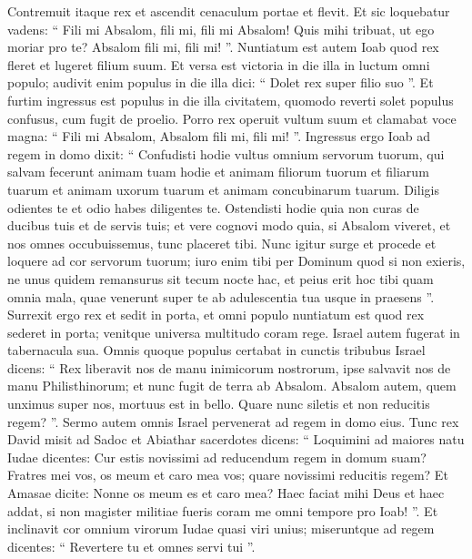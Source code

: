 \begin{biblechapter}
\begin{biblechapter}
\begin{biblechapter}
\begin{biblechapter}
\begin{biblechapter}
\begin{biblechapter}
\begin{biblechapter}
\begin{biblechapter}
\begin{biblechapter}
\begin{biblechapter}
\begin{biblechapter}
\begin{biblechapter}
\begin{biblechapter}
\begin{biblechapter}
\begin{biblechapter}
\begin{biblechapter}
\begin{biblechapter}
\begin{biblechapter}
\begin{biblechapter}
\verse Contremuit itaque rex et ascendit cenaculum portae et flevit. Et sic loquebatur vadens: “ Fili mi Absalom, fili mi, fili mi Absalom! Quis mihi tribuat, ut ego moriar pro te? Absalom fili mi, fili mi! ”.
 \verse Nuntiatum est autem Ioab quod rex fleret et lugeret filium suum. 
\verse Et versa est victoria in die illa in luctum omni populo; audivit enim populus in die illa dici: “ Dolet rex super filio suo ”. 
\verse Et furtim ingressus est populus in die illa civitatem, quomodo reverti solet populus confusus, cum fugit de proelio. 
\verse Porro rex operuit vultum suum et clamabat voce magna: “ Fili mi Absalom, Absalom fili mi, fili mi! ”.
 \verse Ingressus ergo Ioab ad regem in domo dixit: “ Confudisti hodie vultus omnium servorum tuorum, qui salvam fecerunt animam tuam hodie et animam filiorum tuorum et filiarum tuarum et animam uxorum tuarum et animam concubinarum tuarum. 
\verse Diligis odientes te et odio habes diligentes te. Ostendisti hodie quia non curas de ducibus tuis et de servis tuis; et vere cognovi modo quia, si Absalom viveret, et nos omnes occubuissemus, tunc placeret tibi. 
\verse Nunc igitur surge et procede et loquere ad cor servorum tuorum; iuro enim tibi per Dominum quod si non exieris, ne unus quidem remansurus sit tecum nocte hac, et peius erit hoc tibi quam omnia mala, quae venerunt super te ab adulescentia tua usque in praesens ”. 
\verse Surrexit ergo rex et sedit in porta, et omni populo nuntiatum est quod rex sederet in porta; venitque universa multitudo coram rege.
 Israel autem fugerat in tabernacula sua. 
\verse Omnis quoque populus certabat in cunctis tribubus Israel dicens: “ Rex liberavit nos de manu inimicorum nostrorum, ipse salvavit nos de manu Philisthinorum; et nunc fugit de terra ab Absalom. 
\verse Absalom autem, quem unximus super nos, mortuus est in bello. Quare nunc siletis et non reducitis regem? ”.
 \verse Sermo autem omnis Israel pervenerat ad regem in domo eius. Tunc rex David misit ad Sadoc et Abiathar sacerdotes dicens: “ Loquimini ad maiores natu Iudae dicentes: Cur estis novissimi ad reducendum regem in domum suam? 
\verse Fratres mei vos, os meum et caro mea vos; quare novissimi reducitis regem? 
\verse Et Amasae dicite: Nonne os meum es et caro mea? Haec faciat mihi Deus et haec addat, si non magister militiae fueris coram me omni tempore pro Ioab! ”. 
\verse Et inclinavit cor omnium virorum Iudae quasi viri unius; miseruntque ad regem dicentes: “ Revertere tu et omnes servi tui ”. 

\end{biblechapter}
\end{biblechapter}
\end{biblechapter}
\end{biblechapter}
\end{biblechapter}
\end{biblechapter}
\end{biblechapter}
\end{biblechapter}
\end{biblechapter}
\end{biblechapter}
\end{biblechapter}
\end{biblechapter}
\end{biblechapter}
\end{biblechapter}
\end{biblechapter}
\end{biblechapter}
\end{biblechapter}
\end{biblechapter}
\end{biblechapter}
